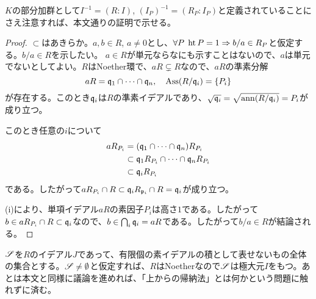 \begin{rem}
  $K$の部分加群として$I^{-1} = (R : I)$, $(I_P)^{-1} = (R_P : I_P)$と定義されていることにさえ注意すれば、本文通りの証明で示せる。
\end{rem}



\begin{proof}
$\subset$はあきらか。$a,b \in R$, $a \neq 0$とし、$\forall P \; \operatorname{ht} P = 1 \Rightarrow b/a \in R_P$と仮定する。$b/a \in R$を示したい。
$a \in R$が単元ならなにも示すことはないので、$a$は単元でないとしてよい。$R$はNoether環で、$aR \subsetneq R$なので、$aR$の準素分解
\[
aR = \mathfrak{q}_1 \cap \cdots \cap \mathfrak{q}_n, \quad \operatorname{Ass}(R / \mathfrak{q}_i) = \{P_i\}
\]
が存在する。このとき$\mathfrak{q}_i$は$R$の準素イデアルであり、$\sqrt{\mathfrak{q}_i} =\sqrt{\operatorname{ann}(R/\mathfrak{q}_i)} =  P_i$が成り立つ。

このとき任意の$i$について%
\begin{align*}
  aR_{P_i} &= (\mathfrak{q}_1 \cap \cdots \cap \mathfrak{q}_n )R_{P_i} \\
  &\subset \mathfrak{q}_1 R_{P_i} \cap \cdots \cap \mathfrak{q}_n R_{P_i} \\
  &\subset \mathfrak{q}_i R_{P_i}
\end{align*}
である。したがって$aR_{P_i} \cap R \subset \mathfrak{q}_i R_{\mathfrak{p}_i} \cap R = \mathfrak{q}_i$が成り立つ。

(i)により、単項イデアル$aR$の素因子$P_i$は高さ$1$である。したがって$b \in aR_{P_i} \cap R \subset \mathfrak{q}_i$なので、$b \in \bigcap_{i} \mathfrak{q}_i = aR$である。したがって$b/a \in R$が結論される。
\end{proof}



\begin{rem}
  $\mathscr{S}$を$R$のイデアル$J$であって、有限個の素イデアルの積として表せないもの全体の集合とする。$\mathscr{S} \neq \emptyset$と仮定すれば、$R$はNoetherなので$\mathscr{S}$は極大元$I$をもつ。あとは本文と同様に議論を進めれば、「上からの帰納法」とは何かという問題に触れずに済む。
\end{rem}
